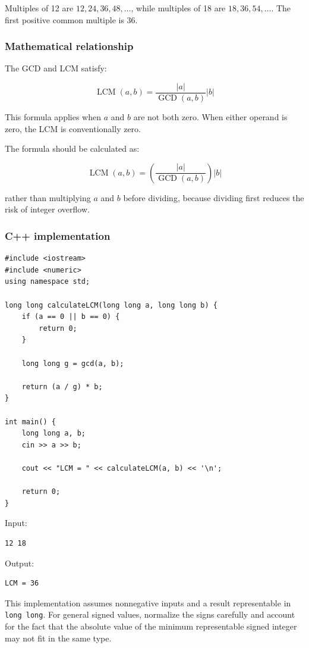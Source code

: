 Multiples of 12 are $12,24,36,48,\ldots$, while multiples of 18 are $18,36,54,\ldots$. The first positive common multiple is 36.

\subsubsection{Mathematical relationship}

The GCD and LCM satisfy:


\[
\boxed{\operatorname{LCM}(a,b)=\frac{|a|}{\operatorname{GCD}(a,b)}|b|}
\]


This formula applies when $a$ and $b$ are not both zero. When either operand is zero, the LCM is conventionally zero.

The formula should be calculated as:


\[
\boxed{\operatorname{LCM}(a,b)=\left(\frac{|a|}{\operatorname{GCD}(a,b)}\right)|b|}
\]


rather than multiplying $a$ and $b$ before dividing, because dividing first reduces the risk of integer overflow.

\subsubsection{C++ implementation}

\begin{lstlisting}[style=cppstyle]
#include <iostream>
#include <numeric>
using namespace std;

long long calculateLCM(long long a, long long b) {
    if (a == 0 || b == 0) {
        return 0;
    }

    long long g = gcd(a, b);

    return (a / g) * b;
}

int main() {
    long long a, b;
    cin >> a >> b;

    cout << "LCM = " << calculateLCM(a, b) << '\n';

    return 0;
}
\end{lstlisting}

Input:

\begin{lstlisting}[style=pseudocode]
12 18
\end{lstlisting}

Output:

\begin{lstlisting}[style=pseudocode]
LCM = 36
\end{lstlisting}

This implementation assumes nonnegative inputs and a result representable in \texttt{long long}. For general signed values, normalize the signs carefully and account for the fact that the absolute value of the minimum representable signed integer may not fit in the same type.

